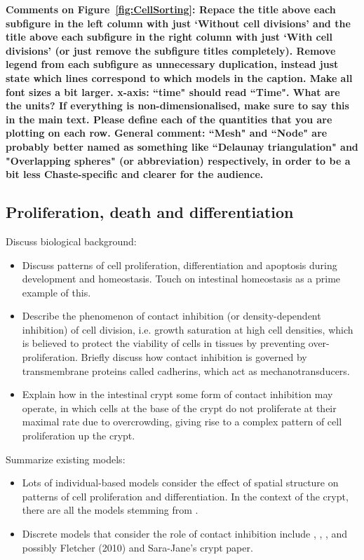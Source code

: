 \documentclass[12pt]{article}
\newcommand{\highlight}[1]{{\color{red} \bf{#1}}}
\begin{document}
\highlight{Comments on Figure~\ref{fig:CellSorting}: 
Repace the title above each subfigure in the left column with just `Without cell divisions' and the title above each subfigure in the right column with just `With cell divisions' (or just remove the subfigure titles completely).
Remove legend from each subfigure as unnecessary duplication, instead just state which lines correspond to which models in the caption. 
Make all font sizes a bit larger. 
x-axis: ``time" should read ``Time". 
What are the units? If everything is non-dimensionalised, make sure to say this in the main text. 
Please define each of the quantities that you are plotting on each row. 
General comment: ``Mesh" and ``Node" are probably better named as something like ``Delaunay triangulation" and "Overlapping spheres" (or abbreviation) respectively, in order to be a bit less Chaste-specific and clearer for the audience.}


\subsection{Proliferation, death and differentiation} \label{sec:proliferation}

Discuss biological background:
\begin{itemize}
\item Discuss patterns of cell proliferation, differentiation and apoptosis during development and homeostasis. Touch on intestinal homeostasis as a prime example of this.
\item Describe the phenomenon of contact inhibition (or density-dependent inhibition) of cell division, i.e. growth saturation at high cell densities, which is believed to protect the viability of cells in tissues by preventing over-proliferation. Briefly discuss how contact inhibition is governed by transmembrane proteins called cadherins, which act as mechanotransducers.
\item Explain how in the intestinal crypt some form of contact inhibition may operate, in which cells at the base of the crypt do not proliferate at their maximal rate due to overcrowding, giving rise to a complex pattern of cell proliferation up the crypt.
\end{itemize}

\noindent Summarize existing models:
\begin{itemize}
\item Lots of individual-based models consider the effect of spatial structure on patterns of cell proliferation and differentiation. In the context of the crypt, there are all the models stemming from \citet{Meineke2001Cell}.
\item Discrete models that consider the role of contact inhibition include \citet{Drasdo2003Individual}, \citet{Drasdo2007Role}, \citet{Galle2005Modeling}, and possibly Fletcher (2010) and Sara-Jane's crypt paper.
\end{itemize}
\end{document}

